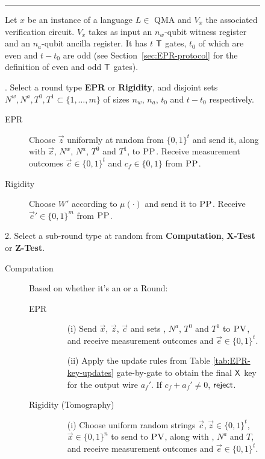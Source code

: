 \begin{figure}[H]
\rule[1ex]{\textwidth}{0.5pt}
\vspace{-20pt}
\justify
Let $x$ be an instance of a language $L \in$ QMA and $V_x$ the associated verification circuit. $V_x$ takes as input  an $n_w$-qubit witness register and an $n_a$-qubit ancilla register. It has $t$ $\sf T$ gates, $t_0$ of which are even and $t-t_0$ are odd (see Section~\ref{sec:EPR-protocol} for the definition of even and odd $\sf T$ gates).

. Select a round type \textbf{EPR} or \textbf{Rigidity}, and disjoint sets
  $N^w,N^a, T^0,T^1\subset \{1,\ldots,m\}$ of sizes $n_w$, $n_a$,  $t_0$ and $t-t_0$ respectively. 
\begin{description}
\item[EPR] Choose $\vec{z}$ uniformly at random from $\{0,1\}^t$ and send it,
  along with $\vec{x}$, $N^w$, $N^a$, $T^0$ and $T^1$, to $\textsc{PP}$. Receive measurement outcomes $\vec{c}\in\{0,1\}^t$ and $c_f\in\{0,1\}$ from $\textsc{PP}$.
\item[Rigidity] Choose $W'$ according to $\mu(\cdot)$ and send it to $\textsc{PP}$. Receive $\vec{e}'\in \{0,1\}^m$ from $\textsc{PP}$. 
\end{description}
2. Select a sub-round type at random from \textbf{Computation}, \textbf{X-Test} or \textbf{Z-Test}. 
\begin{description}
\item[Computation] Based on whether it's an  or a  Round:
	\begin{description}
	\item[EPR]
		\begin{enumerate}
		\item[(i)] Send $\vec{x}$, $\vec{z}$, $\vec{c}$ and sets , $N^a$, $T^0$
      and $T^1$ to $\textsc{PV}$, and receive measurement outcomes  and $\vec{e}\in\{0,1\}^t$.
		\item[(ii)] Apply the update rules from Table \ref{tab:EPR-key-updates} gate-by-gate to obtain the final $\sf X$ key for the output wire $a_f'$. If $c_f+a_f'\neq 0$, $\sf reject$. 
		\end{enumerate}
	\item[Rigidity (Tomography)]
		\begin{enumerate}
		\item[(i)] Choose uniform random strings $\vec{c},\vec{z}\in\{0,1\}^t$, $\vec{x} \in \{0,1\}^n$ 
      to send to $\textsc{PV}$, along with , $N^a$ and $T$, and receive measurement outcomes  and $\vec{e}\in\{0,1\}^t$. 

\end{enumerate}
\end{description}
\end{description}
\end{figure}
